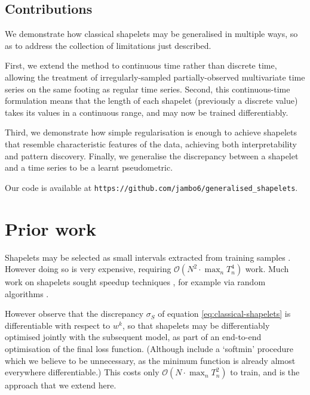 \documentclass{article}
\theoremstyle{plain}
\theoremstyle{definition}
\newcommand{\bigO}{\mathcal{O}}
\begin{document}
	\subsection{Contributions}
	We demonstrate how classical shapelets may be generalised in multiple ways, so as to address the collection of limitations just described.

	First, we extend the method to continuous time rather than discrete time, allowing the treatment of irregularly-sampled partially-observed multivariate time series on the same footing as regular time series. Second, this continuous-time formulation means that the length of each shapelet (previously a discrete value) takes its values in a continuous range, and may now be trained differentiably.
	
	Third, we demonstrate how simple regularisation is enough to achieve shapelets that resemble characteristic features of the data, achieving both interpretability and pattern discovery. Finally, we generalise the discrepancy between a shapelet and a time series to be a learnt pseudometric.%
	
	Our code is available at \texttt{https://github.com/jambo6/generalised\_shapelets}.
	
	\section{Prior work}
	Shapelets may be selected as small intervals extracted from training samples \cite{ye2009firstshapelet}. However doing so is very expensive, requiring $\bigO(N^2 \cdot \max_n T_n^4)$ work. Much work on shapelets sought speedup techniques \cite{mueen2011logical, grabocka2015scalable, grabocka2016speedshapelet}, for example via random algorithms \cite{rak2013fast, wistuba2015ultrafast}.
	
	However \cite{grabocka2014learningshapelet} observe that the discrepancy $\sigma_S$ of equation \eqref{eq:classical-shapelets} is differentiable with respect to $w^{k}$, so that shapelets may be differentiably optimised jointly with the subsequent model, as part of an end-to-end optimisation of the final loss function. (Although \cite{grabocka2014learningshapelet} include a `softmin' procedure which we believe to be unnecessary, as the minimum function is already almost everywhere differentiable.) This costs only $\bigO(N \cdot \max_n T_n^2)$ to train, and is the approach that we extend here.
	
\end{document}
